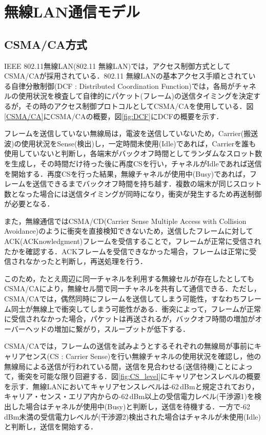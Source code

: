\documentclass[a4paper,10pt]{ltjsarticle}
\begin{document}
\clearpage
\section{無線LAN通信モデル}

\subsection{CSMA/CA方式}


IEEE 802.11無線LAN(802.11 無線LAN)では，アクセス制御方式としてCSMA/CAが採用されている．802.11 無線LANの基本アクセス手順とされている自律分散制御(DCF : Distributed Coordination Function)では，各局がチャネルの使用状況を検査して自律的にパケット(フレーム)の送信タイミングを決定するが，その時のアクセス制御プロトコルとしてCSMA/CAを使用している．図\ref{CSMA/CA}にCSMA/CAの概要，図\ref{fig:DCF}にDCFの概要を示す．

フレームを送信していない無線局は，電波を送信していないため，Carrier(搬送波)の使用状況をSense(検出)し，一定時間未使用(Idle)であれば，Carrierを誰も使用していないと判断し，各端末がバックオフ時間としてランダムなスロット数を生成し，その時間だけ待った後に再度CSを行い，チャネルがIdleであれば送信を開始する．再度CSを行った結果，無線チャネルが使用中(Busy)であれば，フレームを送信できるまでバックオフ時間を持ち越す．複数の端末が同じスロット数となった場合には送信タイミングが同時になり，衝突が発生するため再送制御が必要となる．

また，無線通信ではCSMA/CD(Carrier Sense Multiple Access with Collision Avoidance)のように衝突を直接検知できないため，送信したフレームに対してACK(ACKnowledgment)フレームを受信することで，フレームが正常に受信されたかを確認する．ACKフレームを受信できなかった場合，フレームは正常に受信されなかったと判断し，再送処理を行う．

このため，たとえ周辺に同一チャネルを利用する無線セルが存在したとしてもCSMA/CAにより，無線セル間で同一チャネルを共有して通信できる．ただし，CSMA/CAでは，偶然同時にフレームを送信してしまう可能性，すなわちフレーム同士が無線上で衝突してしまう可能性がある．衝突によって，フレームが正常に受信されなかった場合，パケットは再送されるが，バックオフ時間の増加がオーバーヘッドの増加に繋がり，スループットが低下する．

CSMA/CAでは，フレームの送信を試みようとするそれぞれの無線局が事前にキャリアセンス(CS : Carrier Sense)を行い無線チャネルの使用状況を確認し，他の無線局による送信が行われている間，送信を見合わせる(送信待機)ことによって，衝突を可能な限り回避する．図\ref{fig:CS_level}にキャリアセンスレベルの概要を示す．無線LANにおいてキャリアセンスレベルは-62\,dBmと規定されており，キャリア・センス・エリア内からの-62\,dBm以上の受信電力レベル(干渉源1)を検出した場合はチャネルが使用中(Busy)と判断し，送信を待機する．一方で-62\,dBm未満の受信電力レベルが(干渉源2)検出された場合はチャネルが未使用(Idle)と判断し，送信を開始する．
\end{document}
